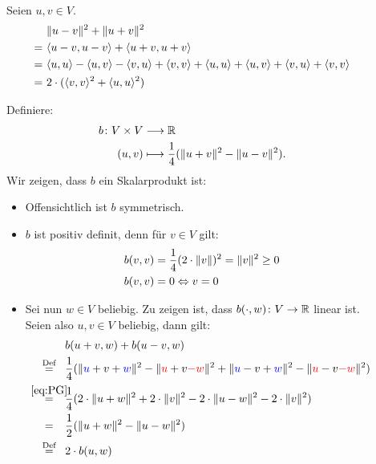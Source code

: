 \begin{beweis}
	\mbox{} \\[-.85cm]
	\begin{description}
		\item[\bewhin] Seien $u,v \in V$.
		\begin{align*}
			&\lVert u-v\rVert^2 + \lVert u+v\rVert^2 \\
			= \  &\langle u-v,u-v\rangle + \langle u+v,u+v\rangle \\
			= \ &\langle u,u\rangle - \langle u,v\rangle - \langle v,u\rangle + \langle v,v\rangle + \langle u,u\rangle + \langle u,v\rangle + \langle v,u\rangle + \langle v,v\rangle \\
			= \ &2 \cdot (\langle v,v\rangle^2 + \langle u,u\rangle^2)
		\end{align*}
		\item[\bewrueck] Definiere:
		\begin{align*}
			b\colon V \times V &\longrightarrow \mathbb{R} \\
			(u,v) &\longmapsto \frac{1}{4} ( \lVert u+v\rVert^2 - \lVert u-v\rVert^2).
		\end{align*} 
		Wir zeigen, dass $b$ ein Skalarprodukt ist: 
		\begin{itemize}
			\item Offensichtlich ist $b$ symmetrisch.
			\item $b$ ist positiv definit, denn für $v \in V$ gilt:
			\begin{align*}
				b(v,v) &= \frac{1}{4} (2\cdot \lVert v\rVert)^2 = \lVert v\rVert^2 \geq 0 \\
				b(v,v) &= 0 \Leftrightarrow v = 0
			\end{align*}
			\item Sei nun $w \in V$ beliebig. Zu zeigen ist, dass $b(\cdot,w) \colon V \rightarrow \mathbb{R}$ linear ist. Seien also $u,v \in V$ beliebig, dann gilt:
			\begin{align}
				&b(u+v,w) + b(u-v,w) \\
				\stack{\text{Def}}{=} &\frac{1}{4} (\Norm{\textcolor{blue}{u}+v+\textcolor{blue}{w}}^2 - \Norm{\textcolor{red}{u}+v\textcolor{red}{-w}}^2 + \Norm{\textcolor{blue}{u}-v+\textcolor{blue}{w}}^2 - \Norm{\textcolor{red}{u}-v\textcolor{red}{-w}}^2) \\
				\stack{\eqref{eq:PG}}{=} &\frac{1}{4} (2 \cdot \Norm{u+w}^2 + 2 \cdot \Norm{v}^2 - 2 \cdot \Norm{u-w}^2 - 2\cdot \Norm{v}^2) \\
				\stack{}{=} &\frac{1}{2} (\Norm{u+w}^2 - \Norm{u-w}^2) \\
				\stack{\text{Def}}{=} &2 \cdot b(u,w) \label{eq:1.14.1}
			\end{align}

\end{itemize}
\end{description}
\end{beweis}
